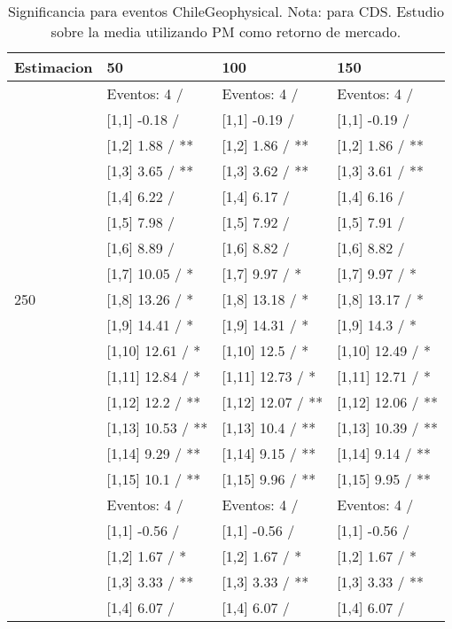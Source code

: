 \begin{table}

\caption{Significancia para eventos ChileGeophysical. Nota: para CDS. Estudio sobre la media utilizando PM como retorno de mercado.}
\centering
\begin{tabular}[t]{llll}
\toprule
Estimacion & 50 & 100 & 150\\
\midrule
 & Eventos:  4 / & Eventos:  4 / & Eventos:  4 /\\
 & {}[1,1] -0.18  / & {}[1,1] -0.19  / & {}[1,1] -0.19  /\\
 & {}[1,2] 1.88  / ** & {}[1,2] 1.86  / ** & {}[1,2] 1.86  / **\\
 & {}[1,3] 3.65  / ** & {}[1,3] 3.62  / ** & {}[1,3] 3.61  / **\\
 & {}[1,4] 6.22  / & {}[1,4] 6.17  / & {}[1,4] 6.16  /\\
\addlinespace
 & {}[1,5] 7.98  / & {}[1,5] 7.92  / & {}[1,5] 7.91  /\\
 & {}[1,6] 8.89  / & {}[1,6] 8.82  / & {}[1,6] 8.82  /\\
 & {}[1,7] 10.05  / * & {}[1,7] 9.97  / * & {}[1,7] 9.97  / *\\
250 & {}[1,8] 13.26  / * & {}[1,8] 13.18  / * & {}[1,8] 13.17  / *\\
 & {}[1,9] 14.41  / * & {}[1,9] 14.31  / * & {}[1,9] 14.3  / *\\
\addlinespace
 & {}[1,10] 12.61  / * & {}[1,10] 12.5  / * & {}[1,10] 12.49  / *\\
 & {}[1,11] 12.84  / * & {}[1,11] 12.73  / * & {}[1,11] 12.71  / *\\
 & {}[1,12] 12.2  / ** & {}[1,12] 12.07  / ** & {}[1,12] 12.06  / **\\
 & {}[1,13] 10.53  / ** & {}[1,13] 10.4  / ** & {}[1,13] 10.39  / **\\
 & {}[1,14] 9.29  / ** & {}[1,14] 9.15  / ** & {}[1,14] 9.14  / **\\
\addlinespace
 & {}[1,15] 10.1  / ** & {}[1,15] 9.96  / ** & {}[1,15] 9.95  / **\\
 & Eventos:  4 / & Eventos:  4 / & Eventos:  4 /\\
 & {}[1,1] -0.56  / & {}[1,1] -0.56  / & {}[1,1] -0.56  /\\
 & {}[1,2] 1.67  / * & {}[1,2] 1.67  / * & {}[1,2] 1.67  / *\\
 & {}[1,3] 3.33  / ** & {}[1,3] 3.33  / ** & {}[1,3] 3.33  / **\\
\addlinespace
 & {}[1,4] 6.07  / & {}[1,4] 6.07  / & {}[1,4] 6.07  /\\

\end{tabular}
\end{table}
